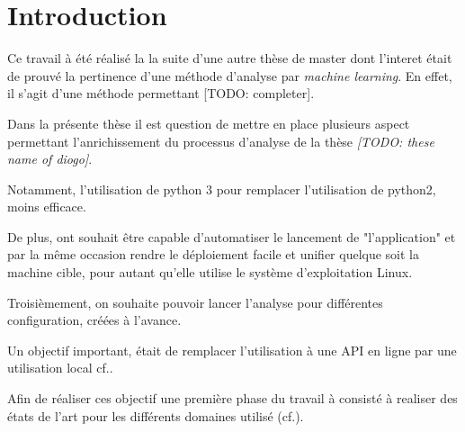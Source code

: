\chapter{Introduction}
\label{ch:introduction}

Ce travail à été réalisé la la suite d'une autre thèse de master dont l'interet était de prouvé la pertinence d'une méthode d'analyse par \emph{machine learning}. En effet, il s'agit d'une méthode permettant [TODO: completer].

Dans la présente thèse il est question de mettre en place plusieurs aspect permettant l'anrichissement du processus d'analyse de la thèse \emph{[TODO: these name of diogo]}. 

Notamment, l'utilisation de python 3 pour remplacer l'utilisation de python2, moins efficace. %

De plus, ont souhait être capable d'automatiser le lancement de "l'application" et par la même occasion rendre le déploiement facile et unifier quelque soit la machine cible, pour autant qu'elle utilise le système d'exploitation Linux.

Troisièmement, on souhaite pouvoir lancer l'analyse pour différentes configuration, créées à l'avance.

Un objectif important, était de remplacer l'utilisation à une API en ligne par une utilisation local cf..

Afin de réaliser ces objectif une première phase du travail à consisté à realiser des états de l'art pour les différents domaines utilisé (cf.). %


